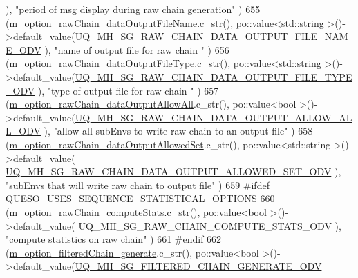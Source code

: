\begin{DoxyCode}
                          ), \textcolor{stringliteral}{"period of msg display during raw chain generation"}          )
655     (\hyperlink{class_q_u_e_s_o_1_1_metropolis_hastings_s_g_options_a28d13976ef26bc450575528a37e1eeb6}{m\_option\_rawChain\_dataOutputFileName}.c\_str(),                
      po::value<std::string >()->default\_value(\hyperlink{_metropolis_hastings_s_g_options_8h_abac180095636122dceb5407269fb701e}{UQ\_MH\_SG\_RAW\_CHAIN\_DATA\_OUTPUT\_FILE\_NAME\_ODV}
                       ), \textcolor{stringliteral}{"name of output file for raw chain "}                         )
656     (\hyperlink{class_q_u_e_s_o_1_1_metropolis_hastings_s_g_options_ae0bc37e9e5982b51f67e9788e4397cfa}{m\_option\_rawChain\_dataOutputFileType}.c\_str(),                
      po::value<std::string >()->default\_value(\hyperlink{_metropolis_hastings_s_g_options_8h_ac16891b2289a371854fd32cc8fdecaa3}{UQ\_MH\_SG\_RAW\_CHAIN\_DATA\_OUTPUT\_FILE\_TYPE\_ODV}
                       ), \textcolor{stringliteral}{"type of output file for raw chain "}                         )
657     (\hyperlink{class_q_u_e_s_o_1_1_metropolis_hastings_s_g_options_a336b749a8e06848243cf5bfbab2e43a6}{m\_option\_rawChain\_dataOutputAllowAll}.c\_str(),                
      po::value<bool        >()->default\_value(\hyperlink{_metropolis_hastings_s_g_options_8h_a1c2ff5442dda1beb21610d94dfaa9a6f}{UQ\_MH\_SG\_RAW\_CHAIN\_DATA\_OUTPUT\_ALLOW\_ALL\_ODV}
                       ), \textcolor{stringliteral}{"allow all subEnvs to write raw chain to an output file"}     )
658     (\hyperlink{class_q_u_e_s_o_1_1_metropolis_hastings_s_g_options_a53a51bf8aa24d9dbe4a9115453bd9e2b}{m\_option\_rawChain\_dataOutputAllowedSet}.c\_str(),              
      po::value<std::string >()->default\_value(
      \hyperlink{_metropolis_hastings_s_g_options_8h_a268d0e24d268778efa90c9839ac2d613}{UQ\_MH\_SG\_RAW\_CHAIN\_DATA\_OUTPUT\_ALLOWED\_SET\_ODV}               
      ), \textcolor{stringliteral}{"subEnvs that will write raw chain to output file"}           )
659 #ifdef QUESO\_USES\_SEQUENCE\_STATISTICAL\_OPTIONS
660     (m\_option\_rawChain\_computeStats.c\_str(),                      po::value<bool        >()->default\_value(
      UQ\_MH\_SG\_RAW\_CHAIN\_COMPUTE\_STATS\_ODV                         ), \textcolor{stringliteral}{"compute statistics on raw chain"}           
                       )
661 #endif
662     (\hyperlink{class_q_u_e_s_o_1_1_metropolis_hastings_s_g_options_abb60803a2ba0d32816a1ac9ad67fe7fd}{m\_option\_filteredChain\_generate}.c\_str(),                     
      po::value<bool        >()->default\_value(\hyperlink{_metropolis_hastings_s_g_options_8h_a5d849c1d612df021c7572c8f64e66c68}{UQ\_MH\_SG\_FILTERED\_CHAIN\_GENERATE\_ODV}     

\end{DoxyCode}
